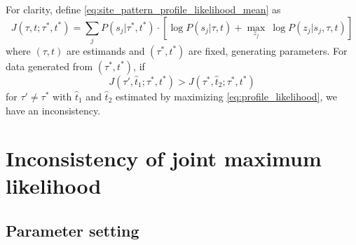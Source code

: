 \documentclass[a4paper]{article}
\begin{document}
For clarity, define \eqref{eq:site_pattern_profile_likelihood_mean} as
$$
J(\tau, t; \tau^*, t^*) = \sum_{j} P(s_j | \tau^*, t^*) \cdot [\log P(s_j | \tau, t) + \max_{z_j} \ \log P(z_j | s_j, \tau, t)]
$$
where $(\tau, t)$ are estimands and $(\tau^*, t^*)$ are fixed, generating parameters.
For data generated from $(\tau^*, t^*)$, if
\begin{equation}
\label{eq:inconsistency_inequality}
J(\tau', \hat{t}_1; \tau^*, t^*) > J(\tau^*, \hat{t}_2; \tau^*, t^*)
\end{equation}
for $\tau'\neq\tau^*$ with $\hat{t}_1$ and $\hat{t}_2$ estimated by maximizing \eqref{eq:profile_likelihood}, we have an inconsistency.

\section{Inconsistency of joint maximum likelihood}

\subsection{Parameter setting}
\end{document}
